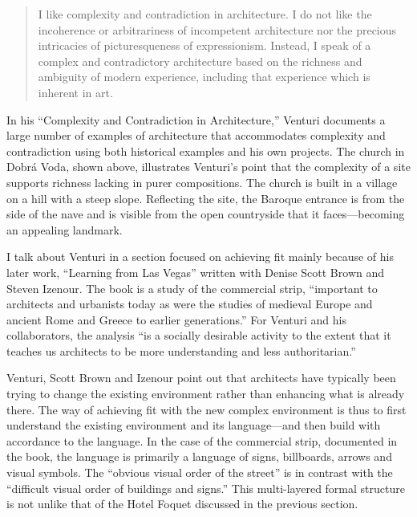 \begin{quote}
I like complexity and contradiction in architecture. I do not like the incoherence or
arbitrariness of incompetent architecture nor the precious intricacies of picturesqueness
of expressionism. Instead, I speak of a complex and contradictory architecture based on the
richness and ambiguity of modern experience, including that experience which is inherent in art.
\end{quote}

In his ``Complexity and Contradiction in Architecture,'' Venturi documents a large number of
examples of architecture that accommodates complexity and contradiction using both historical
examples and his own projects. The church in Dobrá Voda, shown above, illustrates Venturi's point
that the complexity of a site supports richness lacking in purer compositions.
The church is built in a village on a hill with a steep slope. Reflecting the site,
the Baroque entrance is from the side of the nave and is visible from the open countryside
that it faces---becoming an appealing landmark.

I talk about Venturi in a section focused on achieving fit mainly because of his later work,
``Learning from Las Vegas'' written with Denise Scott Brown and Steven Izenour.
The book is a study of the commercial strip, ``important to architects and urbanists today
as were the studies of medieval Europe and ancient Rome and Greece to earlier generations.''
For Venturi and his collaborators, the analysis ``is a socially desirable activity to the
extent that it teaches us architects to be more understanding and less authoritarian.''

Venturi, Scott Brown and Izenour point out that architects have typically been trying to change
the existing environment rather than enhancing what is already there. The way of achieving
fit with the new complex environment is thus to first understand the existing environment
and its language---and then build with accordance to the language. In the case of the commercial
strip, documented in the book, the language is primarily a language of signs, billboards, arrows
and visual symbols. The ``obvious visual order of the street'' is in contrast with the ``difficult
visual order of buildings and signs.'' This multi-layered formal structure is not
unlike that of the Hotel Foquet discussed in the previous section.

